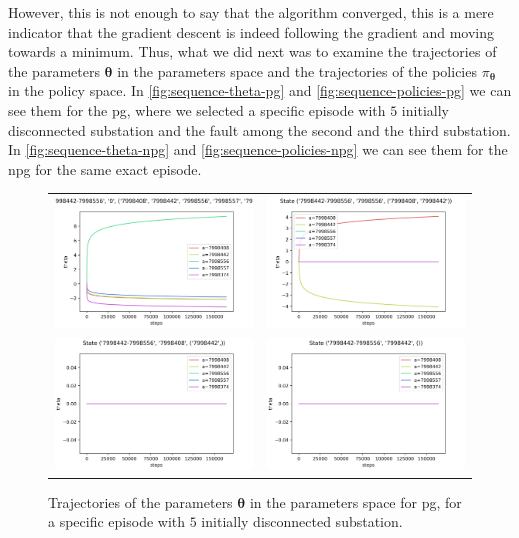 However, this is not enough to say that the algorithm converged, this is a mere indicator that the gradient descent is indeed following the gradient and moving towards a minimum. Thus, what we did next was to examine the trajectories of the parameters $\boldsymbol \theta$ in the parameters space and the trajectories of the policies $\pi_{\boldsymbol \theta}$ in the policy space. In \autoref{fig:sequence-theta-pg} and \autoref{fig:sequence-policies-pg} we can see them for the \acrshort{pg}, where we selected a specific episode with $5$ initially disconnected substation and the fault among the second and the third substation. In \autoref{fig:sequence-theta-npg} and \autoref{fig:sequence-policies-npg} we can see them for the \acrshort{npg} for the same exact episode.

\begin{figure}[!htp]
    \centering
    \begin{tabular}{cc}
        \includegraphics[height=0.27\textwidth,valign=b]{chapters/figures/theta_PG_state_0.png} &
        \includegraphics[height=0.27\textwidth,valign=b]{chapters/figures/theta_PG_state_1.png} \\
        \includegraphics[height=0.27\textwidth,valign=b]{chapters/figures/theta_PG_state_2.png} &
        \includegraphics[height=0.27\textwidth,valign=b]{chapters/figures/theta_PG_state_3.png}
    \end{tabular}
    \caption{Trajectories of the parameters $\boldsymbol \theta$ in the parameters space for \acrshort{pg}, for a specific episode with $5$ initially disconnected substation.}
    \label{fig:sequence-theta-pg}
\end{figure}

